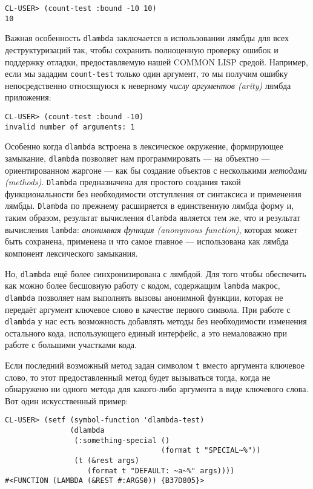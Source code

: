 \begin{verbatim}
CL-USER> (count-test :bound -10 10)
10
\end{verbatim}

Важная особенность \verb"dlambda" заключается в использовании лямбды для всех деструктуризаций так, чтобы сохранить полноценную проверку ошибок и поддержку отладки, предоставляемую нашей COMMON LISP средой. Например, если мы зададим \verb"count-test" только один аргумент, то мы получим ошибку непосредственно относящуюся к неверному \emph{числу аргументов (arity)} лямбда приложения:

\begin{verbatim}
CL-USER> (count-test :bound -10)
invalid number of arguments: 1
\end{verbatim}

Особенно когда \verb"dlambda" встроена в лексическое окружение, формирующее замыкание, \verb"dlambda" позволяет нам программировать --- на объектно --- ориентированном жаргоне --- как бы создание объектов с несколькими \emph{методами (methods)}. \verb"Dlambda" предназначена для простого создания такой функциональности без необходимости отступления от синтаксиса и применения лямбды. \verb"Dlambda" по прежнему расширяется в единственную лямбда форму и, таким образом, результат вычисления \verb"dlambda" является тем же, что и результат вычисления \verb"lambda": \emph{анонимная функция (anonymous function)}, которая может быть сохранена, применена и что самое главное --- использована как лямбда компонент лексического замыкания.

Но, \verb"dlambda" ещё более синхронизирована с лямбдой. Для того чтобы обеспечить как можно более бесшовную работу с кодом, содержащим \verb"lambda" макрос, \verb"dlambda" позволяет нам выполнять вызовы анонимной функции, которая не передаёт аргумент ключевое слово в качестве первого символа. При работе с \verb"dlambda" у нас есть возможность добавлять методы без необходимости изменения остального кода, использующего единый интерфейс, а это немаловажно при работе с большими участками кода.

Если последний возможный метод задан символом \verb"t" вместо аргумента ключевое слово, то этот предоставленный метод будет вызываться тогда, когда не обнаружено ни одного метода для какого-либо аргумента в виде ключевого слова. Вот один искусственный пример:

\begin{verbatim}
CL-USER> (setf (symbol-function 'dlambda-test)
               (dlambda
                (:something-special ()
                                    (format t "SPECIAL~%"))
                (t (&rest args)
                   (format t "DEFAULT: ~a~%" args))))
#<FUNCTION (LAMBDA (&REST #:ARGS0)) {B37D805}>
\end{verbatim}

